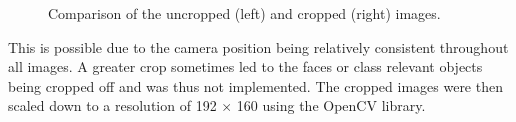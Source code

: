 \begin{figure}[H]
    \centering
    \begin{subfigure}{0.48\textwidth}
        \centering
    \end{subfigure}
    \hfill
    \begin{subfigure}{0.48\textwidth}
        \centering
    \end{subfigure}
    \caption{Comparison of the uncropped (left) and cropped (right) images.}
    \label{fig:comp1}
\end{figure}
\noindent
This is possible due to the camera position being relatively consistent throughout all images. A greater crop sometimes led to the faces or class relevant objects being cropped off and was thus not implemented. 
The cropped images were then scaled down to a resolution of 192 $\times$ 160 using the OpenCV \cite{opencv} library.
